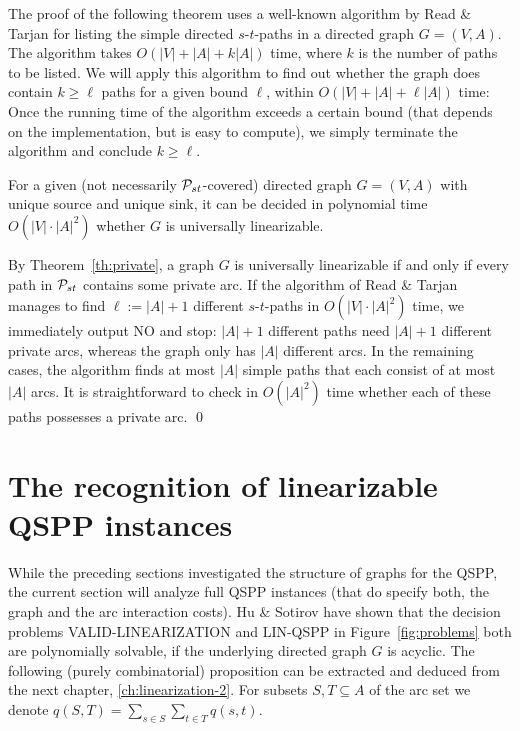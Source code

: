\bigskip
The proof of the following theorem uses a well-known algorithm by Read \& Tarjan \cite{ReTa1975} 
for listing the simple directed $s$-$t$-paths in a directed graph $G=(V,A)$.
The algorithm takes $O(|V|+|A|+k|A|)$ time, where $k$ is the number of paths to be listed.
We will apply this algorithm to find out whether the graph does contain $k\ge\ell$ paths for
a given bound $\ell$, within $O(|V|+|A|+\ell|A|)$ time:
Once the running time of the algorithm exceeds a certain bound (that depends on the implementation,
but is easy to compute), we simply terminate the algorithm and conclude $k\ge\ell$.
\begin{theorem}
\label{th:algo}
For a given (not necessarily ${\cal P}_{st}$-covered) directed graph $G=(V,A)$ with unique source and 
unique sink, it can be decided in polynomial time $O(|V|\cdot|A|^2)$ 
whether $G$ is universally linearizable.
\end{theorem}
\proof
By Theorem~\ref{th:private}, a graph $G$ is universally linearizable if and only if 
every path in ${\cal P}_{st}$ contains some private arc.
If the algorithm of Read \& Tarjan \cite{ReTa1975} manages to find $\ell:=|A|+1$ different 
$s$-$t$-paths in $O(|V|\cdot|A|^2)$ time, we immediately output NO and stop: $|A|+1$ different 
paths need $|A|+1$ different private arcs, whereas the graph only has $|A|$ different arcs.
In the remaining cases, the algorithm finds at most $|A|$ simple paths that each consist of at most $|A|$ arcs.
It is straightforward to check in $O(|A|^2)$ time whether each of these paths possesses 
a private arc.
\qed


\medskip
\section{The recognition of linearizable QSPP instances}
\label{sec:hardness-chapter-4}
While the preceding sections investigated the structure of graphs for the QSPP, 
the current section will analyze full QSPP instances (that do specify both, the 
graph and the arc interaction costs).
Hu \& Sotirov \cite{huSo2021} have shown that the decision problems VALID-LI\-NEARI\-ZA\-TION
and LIN-QSPP in Figure~\ref{fig:problems} both are polynomially solvable, 
if the underlying directed graph $G$ is acyclic.
The following (purely combinatorial) proposition can be extracted and deduced from the next chapter, \cref{ch:linearization-2}.
For subsets $S,T\subseteq A$ of the arc set we denote $q(S,T)=\sum_{s\in S}\sum_{t\in T}q(s,t)$.

